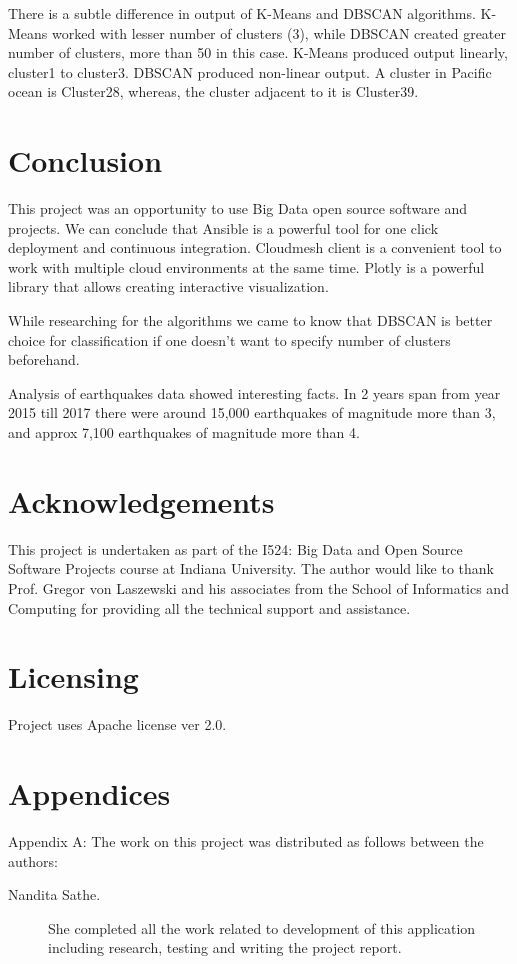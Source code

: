\documentclass[9pt,twocolumn,twoside]{../../styles/osajnl}
\begin{document}
There is a subtle difference in output of K-Means and DBSCAN algorithms. K-Means worked with lesser number of clusters (3), while DBSCAN created greater number of clusters, more than 50 in this case. K-Means produced output linearly, cluster1 to cluster3. DBSCAN produced non-linear output. A cluster in Pacific ocean is Cluster28, whereas, the cluster adjacent to it is Cluster39.  


\section {Conclusion}
This project was an opportunity to use Big Data open source software and projects. 
We can conclude that Ansible is a powerful tool for one click deployment and continuous integration. Cloudmesh client is a convenient tool to work with multiple cloud environments at the same time. Plotly is a powerful library that allows creating interactive visualization. 

While researching for the algorithms we came to know that DBSCAN is better choice for classification if one doesn't want to specify number of clusters beforehand.

Analysis of earthquakes data showed interesting facts. In 2 years span from year 2015 till 2017 there were around 15,000 earthquakes of magnitude more than 3, and approx 7,100 earthquakes of magnitude more than 4.

\section {Acknowledgements}

This project is undertaken as part of the I524: Big Data and Open Source Software Projects course at Indiana University. The author would like to thank Prof. Gregor von Laszewski and his associates from the School of Informatics and Computing for providing all the technical support and assistance.

\section {Licensing}

Project uses Apache license ver 2.0.




 
\newpage

\section{Appendices}

Appendix A: The work on this project was distributed as follows between the
authors:

\begin{description}

\item[Nandita Sathe.] She completed all the work related to development of this application including research, testing and writing the project report. 

\end{description}
\end{document}
